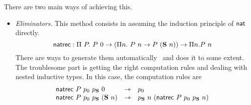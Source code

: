 There are two main ways of achieving this.
\begin{itemize}
  \item \emph{Eliminators.} This method consists in assuming the induction
  principle of \(\mathsf{nat}\) directly.
  \[
    \mathsf{natrec} :
      \Pi\ P.\
        P\ 0 \to
        (\Pi n.\ P\ n \to P\ (\mathbf{S}\ n)) \to
        \Pi n. P\ n
  \]
  There are ways to generate them automatically~
  and \Coq does it to some extent. The troublesome part is getting the
  right computation rules and dealing with nested inductive types.
  In this case, the computation rules are
  \[
    \begin{array}{lcl}
      \mathsf{natrec}\ P\ p_0\ p_{\mathbf{S}}\ 0 &\rightarrowtriangle& p_0 \\
      \mathsf{natrec}\ P\ p_0\ p_{\mathbf{S}}\ (\mathbf{S}\ n) &\rightarrowtriangle&
      p_{\mathbf{S}}\ n\ (\mathsf{natrec}\ P\ p_0\ p_{\mathbf{S}}\ n) \\
    \end{array}
  \]


\end{itemize}
